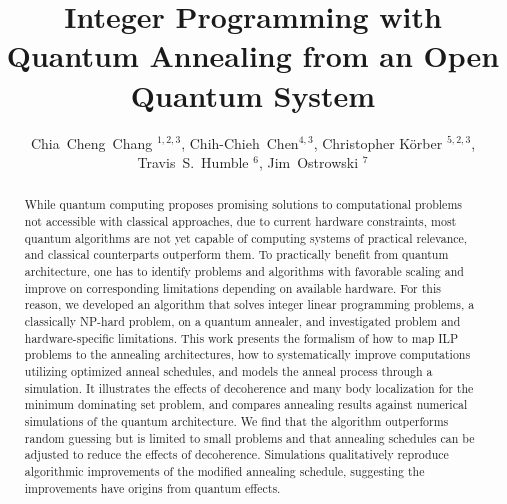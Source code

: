 \documentclass[10pt]{iopart}
\begin{document}
\title{Integer Programming with Quantum Annealing from an Open Quantum System}

\author{Chia~Cheng~Chang $^{1, 2, 3}$, Chih-Chieh~Chen$^{4, 3}$, Christopher K\"orber $^{5, 2, 3}$, Travis~S.~Humble $^6$, Jim~Ostrowski $^7$}
\address{$^1$ RIKEN iTHEMS, Wako, Saitama 351-0198, Japan}
\address{$^2$ Department of Physics, University of California, Berkeley, California 94720, USA}
\address{$^3$ Nuclear Science Division, Lawrence Berkeley National Laboratory, Berkeley, California 94720, USA}
\address{$^4$ R\&D Group, Grid Inc., Tokyo 107-0061, Japan}
\address{$^5$ Institut f\"ur Theoretische Physik II, Ruhr-Universit\"at Bochum, D-44780 Bochum, Germany}
\address{$^6$ Computational Sciences and Engineering, Oak Ridge National Laboratory, Oak Ridge, Tennessee, 37831, USA}
\address{$^7$ Industrial and Systems Engineering, University of Tennessee, Knoxville, Tennessee 37996, USA}

\newcommand{\alert}[1]{\textbf{\color{red}{#1}}}
\renewcommand{\vec}[1]{\boldsymbol{#1}}

\newcommand{\ghissue}[2]{
 \noindent\fbox{\parbox{0.49\textwidth}{
   \alert{[#1]}%
   \\%
   \href{https://github.com/cchang5/quantum\_linear\_programming/pull/#2}{See GitHub issue #2}}%
 }
}


\begin{abstract}
 While quantum computing proposes promising solutions to computational problems not accessible with classical approaches, due to current hardware constraints, most quantum algorithms are not yet capable of computing systems of practical relevance, and classical counterparts outperform them.
 To practically benefit from quantum architecture, one has to identify problems and algorithms with favorable scaling and improve on corresponding limitations depending on available hardware.
 For this reason, we developed an algorithm that solves integer linear programming problems, a classically NP-hard problem, on a quantum annealer, and investigated problem and hardware-specific limitations.
 This work presents the formalism of how to map ILP problems to the annealing architectures, how to systematically improve computations utilizing optimized anneal schedules, and models the anneal process through a simulation.
 It illustrates the effects of decoherence and many body localization for the minimum dominating set problem, and compares annealing results against numerical simulations of the quantum architecture.
 We find that the algorithm outperforms random guessing but is limited to small problems and that annealing schedules can be adjusted to reduce the effects of decoherence.
 Simulations qualitatively reproduce algorithmic improvements of the modified annealing schedule, suggesting the improvements have origins from quantum effects.
\end{abstract}
\end{document}
